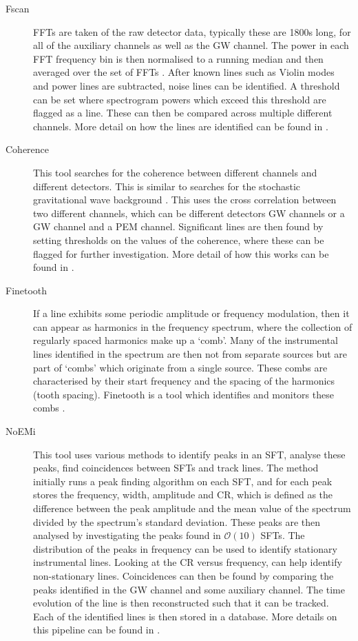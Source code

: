 \begin{description}
	\item[Fscan] \Glspl{FFT} are taken of the raw detector data, typically these are 1800s long, for all of the auxiliary channels as well as the \gls{GW} channel.
	The power in each \gls{FFT} frequency bin is then normalised to a running median and then averaged over the set of \glspl{FFT} \citep{coughlin2010NoiseLine}.  After known lines such as Violin modes and power lines are
	subtracted, noise lines can be identified. A threshold can be set where spectrogram powers which exceed this threshold are flagged as a line. These
	can then be compared across multiple different channels. More detail on how the
	lines are identified can be found in \citep{coughlin2010NoiseLine}.
	
    \item[Coherence] This tool searches for the coherence between different
	channels and different detectors. This is similar to searches for the stochastic
	gravitational wave background \citep{allen1999DetectingStochastic}. This uses the cross correlation between two different channels, which can be different detectors \gls{GW} channels or a \gls{GW} channel and a \gls{PEM} channel. 
	Significant lines are then found by setting thresholds on the values of the coherence, where these can be flagged for further investigation.
	More detail of how this works can be found in \citep{covas2018IdentificationMitigation,coughlin2010NoiseLine,}.
	
	\item[Finetooth] If a line exhibits some periodic amplitude or frequency modulation, then it can appear as harmonics in the frequency spectrum, where the collection of regularly spaced harmonics make up a `comb'. 
	Many of the instrumental lines identified in the spectrum are then not from separate sources but are part of `combs' which originate from a single source. 
	These combs are characterised by their start frequency and the spacing of the harmonics (tooth spacing).
	Finetooth is a tool which identifies and monitors these combs \citep{neunzertGravitationalWaves,neunzertDailyComb}.

	
	\item[\Gls{NoEMi}] This tool uses various methods to identify peaks in an \gls{SFT}, analyse these peaks, find coincidences between \glspl{SFT} and track lines. 
	The method initially runs a peak finding algorithm on each \gls{SFT}, and for each peak stores the frequency, width, amplitude and \gls{CR}, which is defined as the difference between the peak amplitude and the mean value of the spectrum divided by the spectrum's standard deviation.
	These peaks are then analysed by investigating the peaks found in $\mathcal{O}(10)$ \glspl{SFT}. 
	The distribution of the peaks in frequency can be used to identify stationary instrumental lines. 
	Looking at the \gls{CR} versus frequency, can help identify non-stationary lines.
	Coincidences can then be found by comparing the peaks identified in the \gls{GW} channel and some auxiliary channel. 
	The time evolution of the line is then reconstructed such that it can be tracked.
	Each of the identified lines is then stored in a database.
	More details on this pipeline can be found in \citep{accadia2012NoEMiNoise}.


\end{description}
